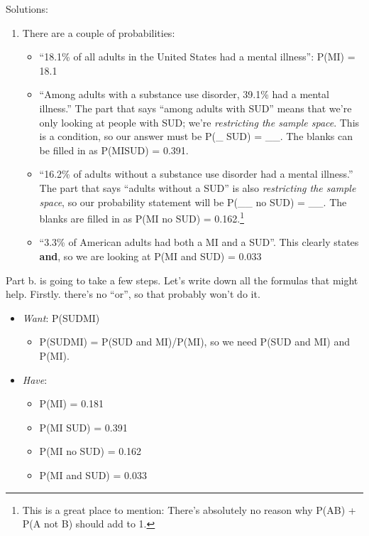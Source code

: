 \documentclass[
  letterpaper,
  DIV=11,
  numbers=noendperiod,
  oneside]{scrreprt}
\providecommand{\tightlist}{%
  \setlength{\itemsep}{0pt}\setlength{\parskip}{0pt}}\usepackage{longtable,booktabs,array}
\begin{document}
Solutions:

\begin{enumerate}
\def\labelenumi{\alph{enumi}.}
\tightlist
\item
  There are a couple of probabilities:

  \begin{itemize}
  \tightlist
  \item
    ``18.1\% of all adults in the United States had a mental illness'':
    P(MI) = 18.1
  \item
    ``Among adults with a substance use disorder, 39.1\% had a mental
    illness.'' The part that says ``among adults with SUD'' means that
    we're only looking at people with SUD; we're \emph{restricting the
    sample space}. This is a condition, so our answer must be P(\_
    \textbar{} SUD) = \_\_. The blanks can be filled in as
    P(MI\textbar SUD) = 0.391.
  \item
    ``16.2\% of adults without a substance use disorder had a mental
    illness.'' The part that says ``adults without a SUD'' is also
    \emph{restricting the sample space}, so our probability statement
    will be P(\_\_ \textbar{} no SUD) = \_\_. The blanks are filled in
    as P(MI \textbar{} no SUD) = 0.162.\footnote{This is a great place
      to mention: There's absolutely no reason why P(A\textbar B) +
      P(A\textbar{} not B) should add to 1.}
  \item
    ``3.3\% of American adults had both a MI and a SUD''. This clearly
    states \textbf{and}, so we are looking at P(MI and SUD) = 0.033
  \end{itemize}
\end{enumerate}

Part b. is going to take a few steps. Let's write down all the formulas
that might help. Firstly. there's no ``or'', so that probably won't do
it.

\begin{itemize}
\tightlist
\item
  \emph{Want}: P(SUD\textbar MI)

  \begin{itemize}
  \tightlist
  \item
    P(SUD\textbar MI) = P(SUD and MI)/P(MI), so we need P(SUD and MI)
    and P(MI).
  \end{itemize}
\item
  \emph{Have}:

  \begin{itemize}
  \tightlist
  \item
    P(MI) = 0.181
  \item
    P(MI \textbar{} SUD) = 0.391
  \item
    P(MI \textbar{} no SUD) = 0.162
  \item
    P(MI and SUD) = 0.033
  \end{itemize}
\end{itemize}
\end{document}
